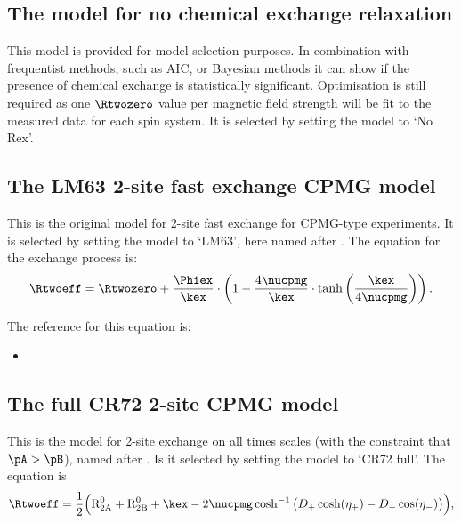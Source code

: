 
\subsection{The model for no chemical exchange relaxation}
\label{sect: dispersion: No Rex model}

This model is provided for model selection purposes.  In combination with frequentist methods, such as AIC, or Bayesian methods it can show if the presence of chemical exchange is statistically significant.  Optimisation is still required as one $\Rtwozero$ value per magnetic field strength will be fit to the measured data for each spin system.  It is selected by setting the model to `No Rex'.




\subsection{The LM63 2-site fast exchange CPMG model}
\label{sect: dispersion: LM63 model}

This is the original model for 2-site fast exchange for CPMG-type experiments.  It is selected by setting the model to `LM63', here named after \citet{LuzMeiboom63}.  The equation for the exchange process is:
\begin{equation}
    \Rtwoeff = \Rtwozero + \frac{\Phiex}{\kex} \cdot \left( 1 - \frac{4\nucpmg}{\kex} \cdot \tanh \left( \frac{\kex}{4\nucpmg} \right) \right) .
\end{equation}

The reference for this equation is:
\begin{itemize}
\item {}
\end{itemize}




\subsection{The full CR72 2-site CPMG model}
\label{sect: dispersion: CR72 full model}

This is the model for 2-site exchange on all times scales (with the constraint that $\pA > \pB$), named after \citet{CarverRichards72}.
Is it selected by setting the model to `CR72 full'.
The equation is
\begin{equation}
    \Rtwoeff = \frac{1}{2} \Big( \textrm{R}_\textrm{2A}^0 + \textrm{R}_\textrm{2B}^0 + \kex - 2\nucpmg\cosh^{-1} \big( D_+\cosh(\eta_+) - D_-\cos(\eta_-) \big) \Big) ,
\end{equation}

